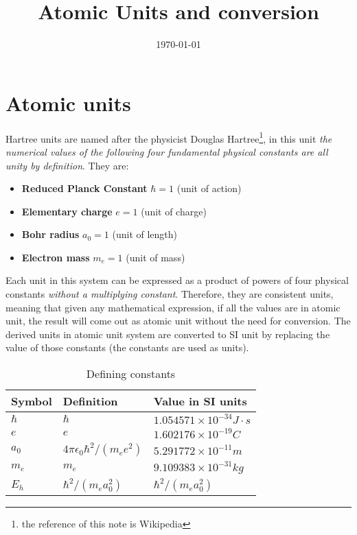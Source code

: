 \documentclass{article}
\begin{document}
    
\title{Atomic Units and conversion}
\date{\today}

\section{Atomic units}
Hartree units are named after the physicist Douglas Hartree\footnote{the reference of this note is Wikipedia}, 
in this unit
\emph{the numerical values of the following four fundamental physical constants 
are all unity by definition}. They are:
\begin{itemize}
    \item \textbf{Reduced Planck Constant} $\hbar=1$ (unit of action)
    \item \textbf{Elementary charge} $e=1$ (unit of charge)
    \item \textbf{Bohr radius} $a_0=1$ (unit of length)
    \item \textbf{Electron mass} $m_e=1$ (unit of mass)
\end{itemize}

Each unit in this system can be expressed as a product of powers of four physical
constants \emph{without a multiplying constant}. Therefore, they are 
consistent units, meaning that given any mathematical expression, if all the values 
are in atomic unit, the result will come out as atomic unit without the need for 
conversion.
The derived units in atomic unit system
are converted to SI unit by replacing the value of those constants (the constants
are used as units).
\begin{table}[h]
    \centering
    \caption{Defining constants}
    \begin{tabular}{|l|l|l|}
        \hline 
        \textbf{Symbol} & \textbf{Definition} & \textbf{Value in SI units} \\ \hline
        $\hbar$         & $\hbar$             &$1.054571\times 10^{-34} J\cdot s$ \\ \hline
        $e$             & $e$                 & $1.602176\times 10^{-19} C$  \\ \hline
        $a_0$           & $4\pi\epsilon_0\hbar^2/(m_ee^2)$ & $5.291772\times 10^{-11} m$  \\ \hline
        $m_e$           & $m_e$               & $9.109383\times 10^{-31} kg$ \\ \hline
        $E_h$           & $\hbar^2/(m_ea_0^2) $ & $\hbar^2/(m_e a_0^2)$ \\ \hline
    \end{tabular}
\end{table}
\end{document}

